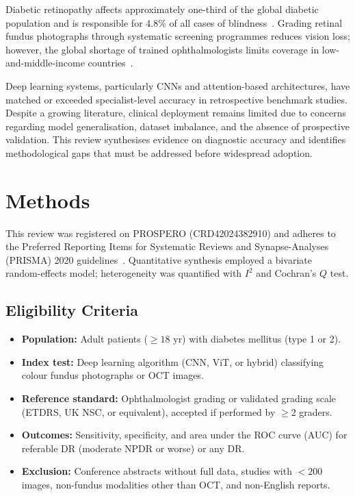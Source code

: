 \documentclass[11pt,a4paper]{article}
\begin{document}
Diabetic retinopathy affects approximately one-third of the global diabetic population
and is responsible for 4.8\% of all cases of blindness~\cite{Cheung2010}. Grading
retinal fundus photographs through systematic screening programmes reduces vision loss;
however, the global shortage of trained ophthalmologists limits coverage in
low-and-middle-income countries~\cite{WHO2019}.

Deep learning systems, particularly CNNs and attention-based architectures, have matched
or exceeded specialist-level accuracy in retrospective benchmark studies.
Despite a growing literature, clinical deployment remains limited due to concerns
regarding model generalisation, dataset imbalance, and the absence of prospective
validation. This review synthesises evidence on diagnostic accuracy and identifies
methodological gaps that must be addressed before widespread adoption.

\section{Methods}

This review was registered on PROSPERO (CRD42024382910) and adheres to the
Preferred Reporting Items for Systematic Reviews and Synapse-Analyses (PRISMA) 2020
guidelines~\cite{Page2021}. Quantitative synthesis employed a bivariate random-effects
model; heterogeneity was quantified with \(I^2\) and Cochran's \(Q\) test.

\subsection{Eligibility Criteria}

\begin{itemize}
  \item \textbf{Population:} Adult patients (\(\geq 18\) yr) with diabetes mellitus (type 1 or 2).
  \item \textbf{Index test:} Deep learning algorithm (CNN, ViT, or hybrid) classifying colour
        fundus photographs or OCT images.
  \item \textbf{Reference standard:} Ophthalmologist grading or validated grading scale
        (ETDRS, UK NSC, or equivalent), accepted if performed by \(\geq 2\) graders.
  \item \textbf{Outcomes:} Sensitivity, specificity, and area under the ROC curve (AUC)
        for referable DR (moderate NPDR or worse) or any DR.
  \item \textbf{Exclusion:} Conference abstracts without full data, studies with
        \(<200\) images, non-fundus modalities other than OCT, and non-English reports.
\end{itemize}
\end{document}
